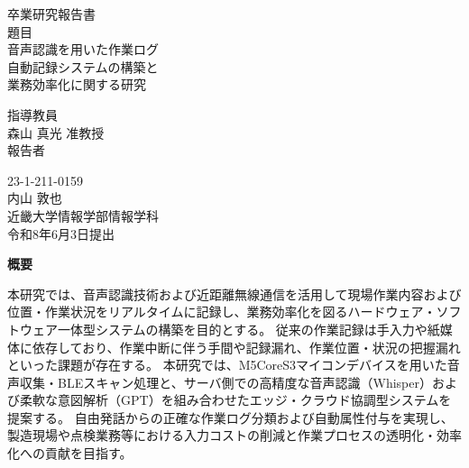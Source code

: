 \documentclass[a4paper,12pt,ja=standard,lualatex]{bxjsarticle}
\begin{document}
\pagestyle{empty}

\begin{center}
\vspace*{1cm}
\large
{\LARGE 卒業研究報告書}\\
\vspace*{0.8cm}
題目\\
\vspace*{1cm}
{\Huge{音声認識を用いた作業ログ}}\\
{\Huge{自動記録システムの構築と}}\\
{\Huge{業務効率化に関する研究}}\\
\vspace{3mm}

\vspace*{3cm}
指導教員\\
\vspace*{0.3cm}
{\LARGE 森山 真光 准教授}\\ 
\vspace*{3cm}
報告者\\
\vspace*{0.3cm}

{23-1-211-0159}\\
\vspace*{0.3cm}
{\Huge 内山 敦也}\\
\vspace*{0.5cm}
近畿大学情報学部情報学科\\
\vspace*{2cm}
令和8年6月3日提出\\
\end{center}

\newpage
\normalsize

\clearpage
\begin{center}
{\bf \Large 概要}
\end{center} 
本研究では、音声認識技術および近距離無線通信を活用して現場作業内容および位置・作業状況をリアルタイムに記録し、業務効率化を図るハードウェア・ソフトウェア一体型システムの構築を目的とする。
従来の作業記録は手入力や紙媒体に依存しており、作業中断に伴う手間や記録漏れ、作業位置・状況の把握漏れといった課題が存在する。
本研究では、M5CoreS3マイコンデバイスを用いた音声収集・BLEスキャン処理と、サーバ側での高精度な音声認識（Whisper）および柔軟な意図解析（GPT）を組み合わせたエッジ・クラウド協調型システムを提案する。
自由発話からの正確な作業ログ分類および自動属性付与を実現し、製造現場や点検業務等における入力コストの削減と作業プロセスの透明化・効率化への貢献を目指す。

\newpage
\end{document}

